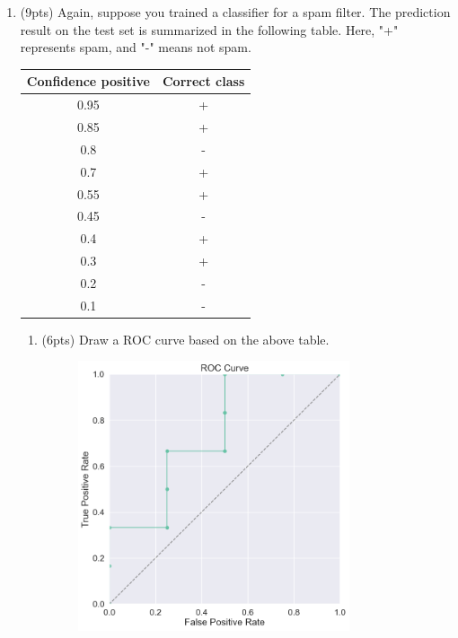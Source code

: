 \documentclass[a4paper]{article}
\theoremstyle{definition}
\newenvironment{soln}{
    \leavevmode\color{blue}\ignorespaces
}{}
\begin{document}
\begin{enumerate}
\begin{enumerate}
\begin{soln}
	\end{soln}
\end{enumerate}


\item (9pts) Again, suppose you trained a classifier for a spam filter. The prediction result on the test set is summarized in the following table. Here, "+" represents spam, and "-" means not spam.

\begin{center}
\begin{tabular}{ c  c }
\hline
Confidence positive & Correct class \\ \hline
0.95 & + \\
0.85 & + \\
0.8 & - \\
0.7 & + \\
0.55 & + \\
0.45 & - \\
0.4 & + \\
0.3 & + \\
0.2 & - \\
0.1 & - \\
\hline
\end{tabular}
\end{center}

\begin{enumerate}
	\item (6pts) Draw a ROC curve based on the above table.
	
	\begin{soln}
		 
	\begin{figure}[h]
		\centering
		\includegraphics[width=8cm]{ROC Curve.png}
	\end{figure}
	
	\end{soln}
	

\end{enumerate}
\end{enumerate}
\end{document}
